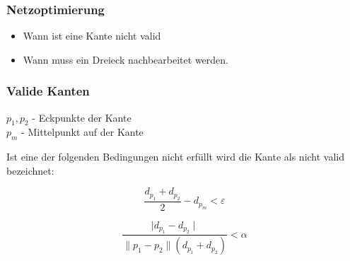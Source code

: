 \documentclass[xcolor=dvipsnames]{beamer}
\begin{document}
\begin{frame}
	\frametitle{Netzoptimierung}
	
	\begin{itemize}
		\item Wann ist eine Kante nicht valid
		\item Wann muss ein Dreieck nachbearbeitet werden.
	\end{itemize}
\end{frame}

\begin{frame}
	\frametitle{Valide Kanten}
	
	$p_1, p_2$ - Eckpunkte der Kante \\
	$p_{m}$	- Mittelpunkt auf der Kante \\
	
	\vspace{.5cm}
	
	Ist eine der folgenden Bedingungen nicht erfüllt wird die Kante 
	als nicht valid bezeichnet:
	
	\begin{equation}
		\frac{d_{p_1} + d_{p_2}}{2} - d_{p_m} < \varepsilon
	\end{equation}
		
	\begin{equation}
	\frac{\mid d_{p_1} - d_{p_2} \mid}{\parallel p_1 - p_2 \parallel (d_{p_1} + d_{p_2})} < \alpha
	\label{eq:EDGE_VALID}
	\end{equation}
	
\end{frame}
\end{document}
